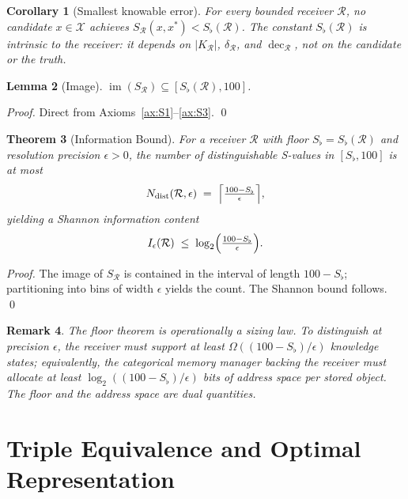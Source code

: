 \documentclass[twocolumn,a4paper]{article}
\newtheorem{theorem}{Theorem}[section]
\newtheorem{lemma}[theorem]{Lemma}
\newtheorem{corollary}[theorem]{Corollary}
\newtheorem{remark}[theorem]{Remark}
\DeclareMathOperator{\img}{im}
\DeclareMathOperator{\dec}{dec}
\newcommand{\Cands}{\mathcal{X}}
\newcommand{\receiver}{\mathcal{R}}
\newcommand{\Sscalar}{S}
\newcommand{\Sfloor}{S_{\flat}}
\begin{document}
\begin{corollary}[Smallest knowable error]
\label{cor:smallest-error}
For every bounded receiver $\receiver$, no candidate $x\in\Cands$ achieves $\Sscalar_{\receiver}(x,x^{*})<\Sfloor(\receiver)$. The constant $\Sfloor(\receiver)$ is intrinsic to the receiver: it depends on $|K_{\receiver}|$, $\delta_{\receiver}$, and $\dec_{\receiver}$, not on the candidate or the truth.
\end{corollary}

\begin{lemma}[Image]
\label{lem:image}
$\img(\Sscalar_{\receiver})\subseteq[\Sfloor(\receiver),100]$.
\end{lemma}

\begin{proof}
Direct from Axioms~\ref{ax:S1}--\ref{ax:S3}. \qed
\end{proof}

\begin{theorem}[Information Bound]
\label{thm:info-bound}
For a receiver $\receiver$ with floor $\Sfloor=\Sfloor(\receiver)$ and resolution precision $\epsilon>0$, the number of distinguishable S-values in $[\Sfloor,100]$ is at most
\[
N_{\text{dist}}(\receiver,\epsilon)\;=\;\Bigl\lceil\tfrac{100-\Sfloor}{\epsilon}\Bigr\rceil,
\]
yielding a Shannon information content
\[
I_{\epsilon}(\receiver)\;\leq\;\log_{2}\Bigl(\tfrac{100-\Sfloor}{\epsilon}\Bigr).
\]
\end{theorem}

\begin{proof}
The image of $\Sscalar_{\receiver}$ is contained in the interval of length $100-\Sfloor$; partitioning into bins of width $\epsilon$ yields the count. The Shannon bound follows. \qed
\end{proof}

\begin{remark}
The floor theorem is operationally a sizing law. To distinguish at precision $\epsilon$, the receiver must support at least $\Omega((100-\Sfloor)/\epsilon)$ knowledge states; equivalently, the categorical memory manager backing the receiver must allocate at least $\log_{2}((100-\Sfloor)/\epsilon)$ bits of address space per stored object. The floor and the address space are dual quantities.
\end{remark}

\part{Triple Equivalence and Optimal Representation}
\end{document}
